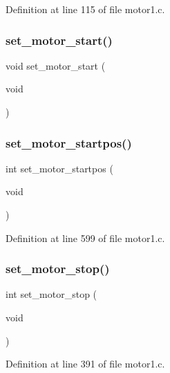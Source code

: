 Definition at line 115 of file motor1.\+c.

\mbox{\label{motor_8h_abf76d04e05d82d2c5393a0a4484f8b06}} 
\subsubsection{set\+\_\+motor\+\_\+start()}
{\footnotesize\ttfamily void set\+\_\+motor\+\_\+start (\begin{DoxyParamCaption}\item[{void}]{ }\end{DoxyParamCaption})}

\mbox{\label{motor_8h_a01a9f2f0272b5b4f53e9b5d8487328a5}} 
\subsubsection{set\+\_\+motor\+\_\+startpos()}
{\footnotesize\ttfamily int set\+\_\+motor\+\_\+startpos (\begin{DoxyParamCaption}\item[{void}]{ }\end{DoxyParamCaption})}



Definition at line 599 of file motor1.\+c.

\mbox{\label{motor_8h_afd8be57a5ca0755c4b210876e2dcc671}} 
\subsubsection{set\+\_\+motor\+\_\+stop()}
{\footnotesize\ttfamily int set\+\_\+motor\+\_\+stop (\begin{DoxyParamCaption}\item[{void}]{ }\end{DoxyParamCaption})}



Definition at line 391 of file motor1.\+c.

\mbox{\label{motor_8h_af698744904934cb05bd21988118b1920}} 
